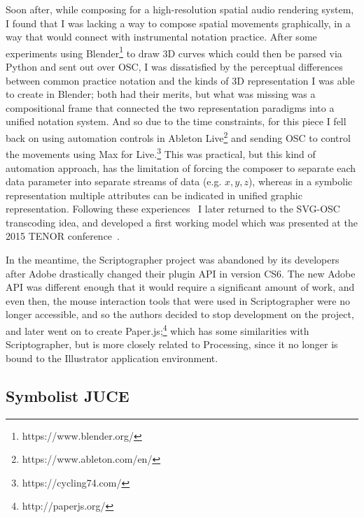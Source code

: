 \documentclass{article}
\begin{document}
Soon after, while composing for a high-resolution spatial audio rendering system, I found that I was lacking a way to compose spatial movements graphically, in a way that would connect with instrumental notation practice.
After some experiments using Blender\footnote{https://www.blender.org/} to draw 3D curves which could then be parsed via Python and sent out over OSC, I was dissatisfied by the perceptual differences between common practice notation and the kinds of 3D representation I was able to create in Blender; both had their merits, but what was missing was a compositional frame that connected the two representation paradigms into a unified notation system.
And so due to the time constraints, for this piece I fell back on using automation controls in Ableton Live\footnote{https://www.ableton.com/en/} and sending OSC to control the movements using Max for Live.\footnote{https://cycling74.com/}
This was practical, but this kind of automation approach, has the limitation of forcing the composer to separate each data parameter into separate streams of data (e.g. $x, y, z$), whereas in a symbolic representation multiple attributes can be indicated in unified graphic representation. 
Following these experiences~\cite{gottfried2013studies} I later returned to the SVG-OSC transcoding idea, and developed a first working model which was presented at the 2015 TENOR conference~\cite{gottfried2015svg}.

In the meantime, the Scriptographer project was abandoned by its developers after Adobe drastically changed their plugin API in version CS6. 
The new Adobe API was different enough that it would require a significant amount of work, and even then, the mouse interaction tools that were used in Scriptographer were no longer accessible, and so the authors decided to stop development on the project, and later  went on to create Paper.js;\footnote{http://paperjs.org/} which has some similarities with Scriptographer, but is more closely related to Processing, since it no longer is bound to the Illustrator application environment. 


\subsection*{Symbolist JUCE}\label{sec:juce_version}
\end{document}
